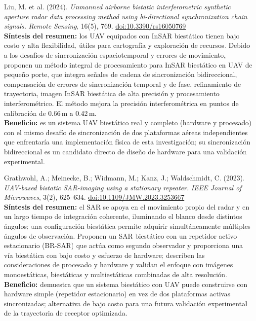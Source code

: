 \documentclass[11pt,a4paper]{report}
\begin{document}
\begin{enumerate}[label=\textbf{[D\arabic*]}, leftmargin=2.2cm, itemsep=10pt]

\item Liu, M. et al. (2024). \textit{Unmanned airborne bistatic
interferometric synthetic aperture radar data processing method using
bi-directional synchronization chain signals.} \emph{Remote Sensing},
16(5), 769. \href{https://doi.org/10.3390/rs16050769}{doi:10.3390/rs16050769}
\cite{liu2024}\\
\textbf{Síntesis del resumen:} los UAV equipados con InSAR biestático tienen
bajo costo y alta flexibilidad, útiles para cartografía y exploración de
recursos. Debido a los desafíos de sincronización espaciotemporal y errores
de movimiento, proponen un método integral de procesamiento para InSAR
biestático en UAV de pequeño porte, que integra señales de cadena de
sincronización bidireccional, compensación de errores de sincronización
temporal y de fase, refinamiento de trayectoria, imagen InSAR biestática de
alta precisión y procesamiento interferométrico. El método mejora la
precisión interferométrica en puntos de calibración de 0.66\,m a 0.42\,m.\\
\textbf{Beneficio:} es un sistema UAV biestático real y completo (hardware y
procesado) con el mismo desafío de sincronización de dos plataformas aéreas
independientes que enfrentaría una implementación física de esta
investigación; su sincronización bidireccional es un candidato directo de
diseño de hardware para una validación experimental.

\item Grathwohl, A.; Meinecke, B.; Widmann, M.; Kanz, J.; Waldschmidt, C.
(2023). \textit{UAV-based bistatic SAR-imaging using a stationary
repeater.} \emph{IEEE Journal of Microwaves}, 3(2), 625--634.
\href{https://doi.org/10.1109/JMW.2023.3253667}{doi:10.1109/JMW.2023.3253667}
\cite{grathwohl2023}\\
\textbf{Síntesis del resumen:} el SAR se apoya en el movimiento propio del
radar y en un largo tiempo de integración coherente, iluminando el blanco
desde distintos ángulos; una configuración biestática permite adquirir
simultáneamente múltiples ángulos de observación. Proponen un SAR
biestático con un repetidor activo estacionario (BR-SAR) que actúa como
segundo observador y proporciona una vía biestática con bajo costo y
esfuerzo de hardware; describen las consideraciones de procesado y hardware
y validan el enfoque con imágenes monoestáticas, biestáticas y
multiestáticas combinadas de alta resolución.\\
\textbf{Beneficio:} demuestra que un sistema biestático con UAV puede
construirse con hardware simple (repetidor estacionario) en vez de dos
plataformas activas sincronizadas; alternativa de bajo costo para una
futura validación experimental de la trayectoria de receptor optimizada.


\end{enumerate}
\end{document}
